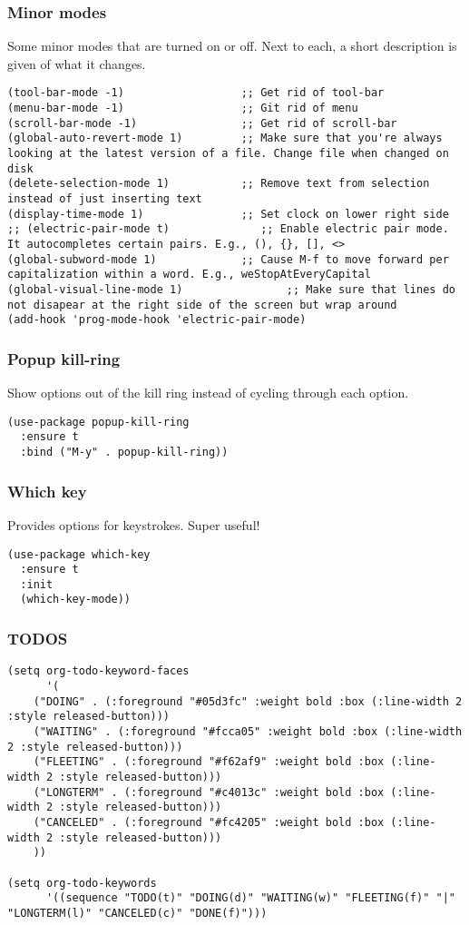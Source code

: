 \documentclass[11pt]{article}
\begin{document}
\subsubsection{Minor modes}
\label{sec:orgc9b1f06}
Some minor modes that are turned on or off. Next to each, a short description is given of what it changes.
\begin{verbatim}
(tool-bar-mode -1)                  ;; Get rid of tool-bar
(menu-bar-mode -1)                  ;; Git rid of menu
(scroll-bar-mode -1)                ;; Get rid of scroll-bar
(global-auto-revert-mode 1)         ;; Make sure that you're always looking at the latest version of a file. Change file when changed on disk
(delete-selection-mode 1)           ;; Remove text from selection instead of just inserting text
(display-time-mode 1)               ;; Set clock on lower right side
;; (electric-pair-mode t)              ;; Enable electric pair mode. It autocompletes certain pairs. E.g., (), {}, [], <>
(global-subword-mode 1)             ;; Cause M-f to move forward per capitalization within a word. E.g., weStopAtEveryCapital
(global-visual-line-mode 1)                ;; Make sure that lines do not disapear at the right side of the screen but wrap around
(add-hook 'prog-mode-hook 'electric-pair-mode)
\end{verbatim}
\subsubsection{Popup kill-ring}
\label{sec:orgbbeaeae}
Show options out of the kill ring instead of cycling through each option.
\begin{verbatim}
(use-package popup-kill-ring
  :ensure t
  :bind ("M-y" . popup-kill-ring))
\end{verbatim}
\subsubsection{Which key}
\label{sec:org595a58b}
Provides options for keystrokes. Super useful!
\begin{verbatim}
(use-package which-key
  :ensure t
  :init
  (which-key-mode))
\end{verbatim}
\subsubsection{TODOS}
\label{sec:org8b3f392}
\begin{verbatim}
(setq org-todo-keyword-faces
      '(
	("DOING" . (:foreground "#05d3fc" :weight bold :box (:line-width 2 :style released-button)))
	("WAITING" . (:foreground "#fcca05" :weight bold :box (:line-width 2 :style released-button)))
	("FLEETING" . (:foreground "#f62af9" :weight bold :box (:line-width 2 :style released-button)))
	("LONGTERM" . (:foreground "#c4013c" :weight bold :box (:line-width 2 :style released-button)))
	("CANCELED" . (:foreground "#fc4205" :weight bold :box (:line-width 2 :style released-button)))
	))

(setq org-todo-keywords
      '((sequence "TODO(t)" "DOING(d)" "WAITING(w)" "FLEETING(f)" "|" "LONGTERM(l)" "CANCELED(c)" "DONE(f)")))
\end{verbatim}
\end{document}
